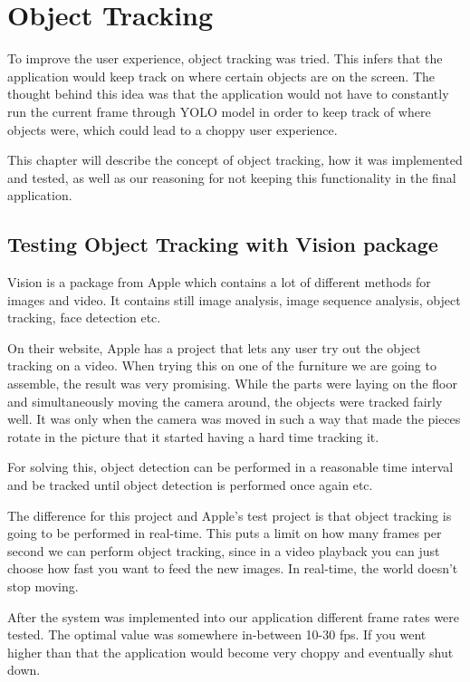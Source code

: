 \chapter{Object Tracking}
To improve the user experience, object tracking was tried. This infers that the application would keep track on where certain objects are on the screen. The thought behind this idea was that the application would not have to constantly run the current frame through YOLO model in order to keep track of where objects were, which could lead to a choppy user experience.

This chapter will describe the concept of object tracking, how it was implemented and tested, as well as our reasoning for not keeping this functionality in the final application.

\section{Testing Object Tracking with Vision package}
Vision is a package from Apple which contains a lot of different methods for images and 
video. It contains still image analysis, image sequence analysis, object tracking, face 
detection etc.

On their website, Apple has a project that lets any user try out the object tracking on a 
video. When trying this on one of the furniture we are going to assemble, the result was 
very promising. While the parts were laying on the floor and simultaneously moving the 
camera around, the objects were tracked fairly well. It was only when the camera was moved 
in such a way that made the pieces rotate in the picture that it started having a hard time 
tracking it.

For solving this, object detection can be performed in a reasonable time interval and be tracked until object detection is performed once again etc.

\cite{ObjectTracking}
The difference for this project and Apple's test project is that object tracking is going to 
be performed in real-time. This puts a limit on how many frames per second we can perform 
object tracking, since in a video playback you can just choose how fast you want to feed the 
new images. In real-time, the world doesn't stop moving.

After the system was implemented into our application different frame rates were tested. The 
optimal value was somewhere in-between 10-30 fps. If you went higher than that the 
application would become very choppy and eventually shut down.

